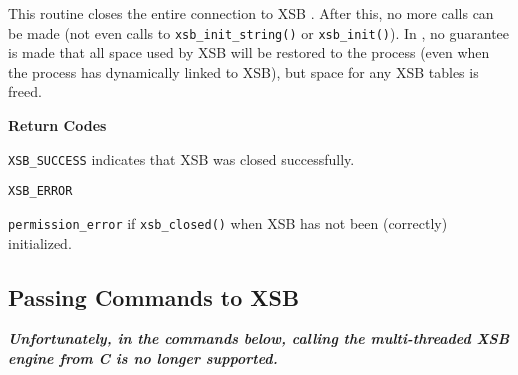 \begin{description}
%
This routine closes the entire connection to XSB .  After this, no
more calls can be made (not even calls to {\tt xsb\_init\_string()} or
{\tt xsb\_init()}).  In \version{}, no guarantee is made that all
space used by XSB will be restored to the process (even when the
process has dynamically linked to XSB), but space for any XSB tables
is freed.

{\bf Return Codes} 
\bi
\item {\tt XSB\_SUCCESS} indicates that XSB was closed successfully.
%
\item {\tt XSB\_ERROR} 
\bi
\item {\tt permission\_error} if {\tt xsb\_closed()} when XSB has not been
(correctly) initialized.  
\ei
%
\ei

\end{description}

\subsection{Passing Commands to XSB}
           {\bf {\em Unfortunately, in the commands below, calling the
               multi-threaded XSB engine from C is no longer
               supported.}}
             
